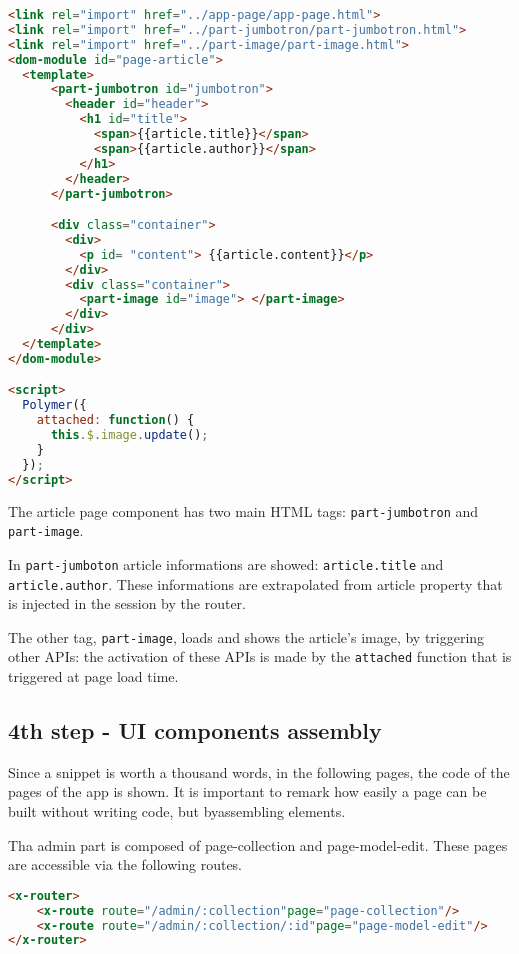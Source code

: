 \begin{lstlisting}[language=html]
<link rel="import" href="../app-page/app-page.html">
<link rel="import" href="../part-jumbotron/part-jumbotron.html">
<link rel="import" href="../part-image/part-image.html">
<dom-module id="page-article">
  <template>
      <part-jumbotron id="jumbotron">
        <header id="header">
          <h1 id="title">
            <span>{{article.title}}</span>
            <span>{{article.author}}</span>
          </h1>
        </header>
      </part-jumbotron>

      <div class="container">
        <div>
          <p id= "content"> {{article.content}}</p>
        </div>
        <div class="container">
          <part-image id="image"> </part-image>
        </div> 
      </div>
  </template>
</dom-module>

<script>
  Polymer({
    attached: function() {
      this.$.image.update();
    }
  });
</script>
\end{lstlisting}



The article page component has two main HTML tags: \texttt{part-jumbotron} and \texttt{part-image}.

In \texttt{part-jumboton} article informations are showed: \texttt{{{article.title}}} and \texttt{{{article.author}}}. These informations are extrapolated from article property that is injected in the session by the router.

The other tag, \texttt{part-image}, loads and shows the article's image, by triggering other APIs: the activation of these APIs is made by the \texttt{attached} function that is triggered at page load time.



\subsection{4th step - UI components assembly}

Since a snippet is worth a thousand words, in the following pages, the code of the pages of the app is shown. It is important to remark how easily a page can be built without writing code, but byassembling elements.

Tha admin part is composed of page-collection and page-model-edit. These pages are accessible via the following routes.

\begin{lstlisting}[language=html]
<x-router>
	<x-route route="/admin/:collection"page="page-collection"/>
	<x-route route="/admin/:collection/:id"page="page-model-edit"/>
</x-router>
\end{lstlisting}

